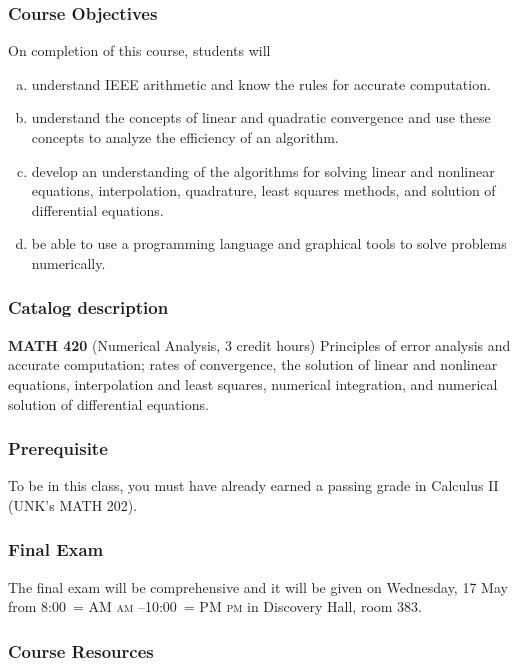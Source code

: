 \documentclass[12pt,fullpage]{article}
\makeatletter
\newcounter{ex}\setcounter{ex}{0}
\newenvironment{alphalist}{
  \begin{enumerate}[(a)]
    \addtolength{\itemsep}{-0.5\itemsep}}
  {\end{enumerate}}
\DeclareRobustCommand{\maybefakesc}[1]{%
  \ifnum\pdfstrcmp{\f@series}{\bfdefault}=\z@
    {\fontsize{\dimexpr0.8\dimexpr\f@size pt\relax}{0}\selectfont\uppercase{#1}}%
  \else
    \textsc{#1}%
  \fi
}
\newcommand\AM{\,\maybefakesc{am}\xspace}
\newcommand\PM{\,\maybefakesc{pm}\xspace}
\newcommand{\room}{Discovery Hall, room  383}
\newcommand{\finalexam}{The final exam will be comprehensive and it 
will be given on Wednesday, 17 May from 8:00\AM{}--10:00\PM}
\makeatother
\begin{document}
\subsubsection*{Course Objectives}

On completion of this course, students will
\begin{alphalist}
    \item understand IEEE arithmetic and know the rules for accurate computation.
    \item understand the concepts of linear and quadratic convergence and use these concepts to analyze 
        the efficiency of an algorithm.
    \item develop an understanding of the algorithms for solving linear and nonlinear equations, interpolation, 
       quadrature, least squares methods, and solution of differential equations.
    \item be able to use a programming language and graphical tools to solve problems 
    numerically.
\end{alphalist}

\subsubsection*{Catalog description}

    \textbf{MATH 420} (Numerical Analysis, 3 credit hours) Principles of
    error analysis and accurate computation; rates of convergence, the solution 
    of linear and nonlinear equations, interpolation and least squares, 
    numerical integration, and numerical solution of differential equations.


\subsubsection*{Prerequisite}

To be in this class, you must have already earned a passing grade in Calculus II (UNK's MATH 202).

\subsubsection*{Final Exam}

\finalexam{} in \room.

\subsubsection*{Course Resources}
\end{document}
